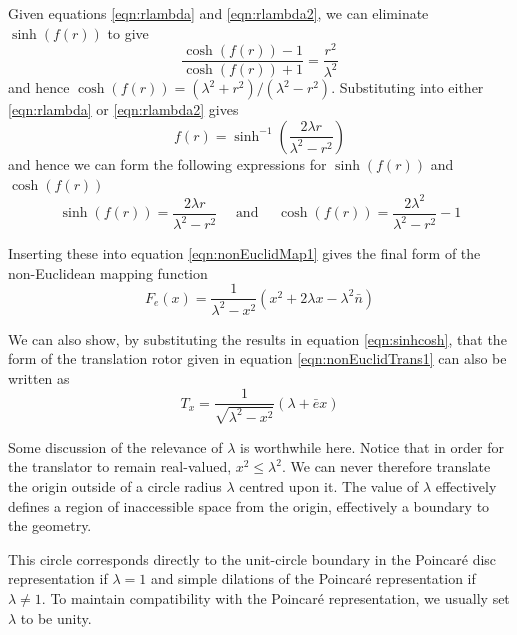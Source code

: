 Given equations \ref{eqn:rlambda} and \ref{eqn:rlambda2}, we can eliminate
$\sinh(f(r))$ to give
\begin{equation}
\frac{\cosh(f(r)) -1}{\cosh(f(r)) + 1} = \frac{r^2}{\lambda^2}
\end{equation}
and hence $\cosh(f(r)) = (\lambda^2 + r^2)/(\lambda^2 - r^2)$. Substituting
into either \ref{eqn:rlambda} or \ref{eqn:rlambda2} gives
\begin{equation}
f(r) = \sinh^{-1}\left( \frac{2\lambda r}{\lambda^2 - r^2} \right)
\end{equation}
and hence we can form the following expressions for 
$\sinh(f(r))$ and $\cosh(f(r))$
\begin{equation}
\sinh(f(r)) = \frac{2\lambda r}{\lambda^2 - r^2} \quad \mbox{ and } \quad
\cosh(f(r)) = \frac{2\lambda^2}{\lambda^2 - r^2} - 1
\end{equation}

Inserting these into equation \ref{eqn:nonEuclidMap1} gives the final form
of the non-Euclidean mapping function
\begin{equation}
F_e(x) = \frac{1}{\lambda^2 - x^2}(x^2 + 2\lambda x - \lambda^2\bar{n})
\label{eqn:nonEuclidMapping}
\end{equation}

We can also show, by substituting the results in equation \ref{eqn:sinhcosh}, 
that the form of the translation rotor given in 
equation \ref{eqn:nonEuclidTrans1} can also be written as
\begin{equation}
T_x = \frac{1}{\sqrt{\lambda^2 - x^2}}(\lambda + \bar{e}x)
\label{eqn:transrotor}
\end{equation}

Some discussion of the relevance of $\lambda$ is worthwhile here. Notice that
in order for the translator to remain real-valued, $x^2 \le \lambda^2$. 
We can never therefore translate the origin outside of a circle radius
$\lambda$ centred upon it. The value of $\lambda$ effectively defines
a region of inaccessible space from the origin, effectively a boundary to
the geometry.

This circle corresponds directly to the unit-circle boundary in the
Poincar\'e disc representation if $\lambda = 1$ and simple dilations of
the Poincar\'e representation if $\lambda \ne 1$. To maintain compatibility
with the Poincar\'e representation, we usually set $\lambda$ to be unity.

